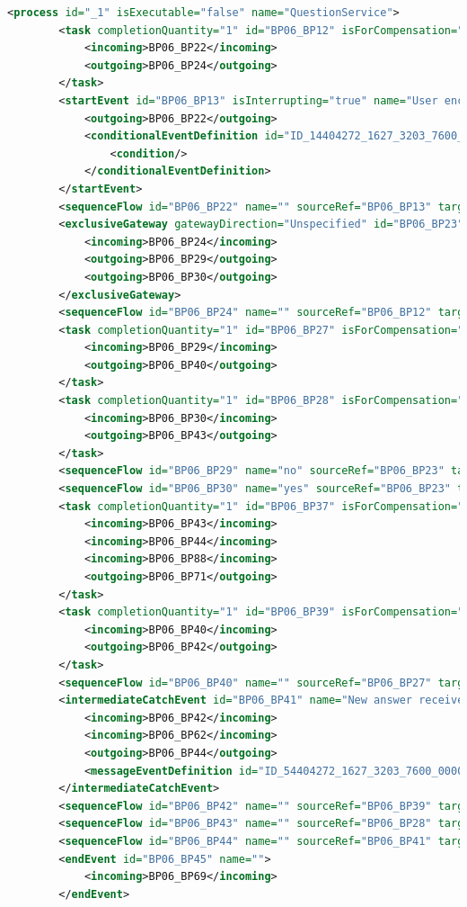 \documentclass[runningheads]{llncs}
\begin{document}
    \begin{lstlisting}[language={XML}]
        <process id="_1" isExecutable="false" name="QuestionService">
		<task completionQuantity="1" id="BP06_BP12" isForCompensation="false" name="Search Question">
			<incoming>BP06_BP22</incoming>
			<outgoing>BP06_BP24</outgoing>
		</task>
		<startEvent id="BP06_BP13" isInterrupting="true" name="User encounter puzzle">
			<outgoing>BP06_BP22</outgoing>
			<conditionalEventDefinition id="ID_14404272_1627_3203_7600_000000200040">
				<condition/>
			</conditionalEventDefinition>
		</startEvent>
		<sequenceFlow id="BP06_BP22" name="" sourceRef="BP06_BP13" targetRef="BP06_BP12"/>
		<exclusiveGateway gatewayDirection="Unspecified" id="BP06_BP23" name="Found relateive question?">
			<incoming>BP06_BP24</incoming>
			<outgoing>BP06_BP29</outgoing>
			<outgoing>BP06_BP30</outgoing>
		</exclusiveGateway>
		<sequenceFlow id="BP06_BP24" name="" sourceRef="BP06_BP12" targetRef="BP06_BP23"/>
		<task completionQuantity="1" id="BP06_BP27" isForCompensation="false" name="Add Question">
			<incoming>BP06_BP29</incoming>
			<outgoing>BP06_BP40</outgoing>
		</task>
		<task completionQuantity="1" id="BP06_BP28" isForCompensation="false" name="Click Relative Question">
			<incoming>BP06_BP30</incoming>
			<outgoing>BP06_BP43</outgoing>
		</task>
		<sequenceFlow id="BP06_BP29" name="no" sourceRef="BP06_BP23" targetRef="BP06_BP27"/>
		<sequenceFlow id="BP06_BP30" name="yes" sourceRef="BP06_BP23" targetRef="BP06_BP28"/>
		<task completionQuantity="1" id="BP06_BP37" isForCompensation="false" name="View Answers">
			<incoming>BP06_BP43</incoming>
			<incoming>BP06_BP44</incoming>
			<incoming>BP06_BP88</incoming>
			<outgoing>BP06_BP71</outgoing>
		</task>
		<task completionQuantity="1" id="BP06_BP39" isForCompensation="false" name="Follow Question">
			<incoming>BP06_BP40</incoming>
			<outgoing>BP06_BP42</outgoing>
		</task>
		<sequenceFlow id="BP06_BP40" name="" sourceRef="BP06_BP27" targetRef="BP06_BP39"/>
		<intermediateCatchEvent id="BP06_BP41" name="New answer received">
			<incoming>BP06_BP42</incoming>
			<incoming>BP06_BP62</incoming>
			<outgoing>BP06_BP44</outgoing>
			<messageEventDefinition id="ID_54404272_1627_3203_7600_000000200041"/>
		</intermediateCatchEvent>
		<sequenceFlow id="BP06_BP42" name="" sourceRef="BP06_BP39" targetRef="BP06_BP41"/>
		<sequenceFlow id="BP06_BP43" name="" sourceRef="BP06_BP28" targetRef="BP06_BP37"/>
		<sequenceFlow id="BP06_BP44" name="" sourceRef="BP06_BP41" targetRef="BP06_BP37"/>
		<endEvent id="BP06_BP45" name="">
			<incoming>BP06_BP69</incoming>
		</endEvent>

\end{lstlisting}
\end{document}
